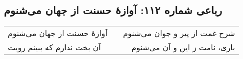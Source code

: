 \begin{center}
\section*{رباعی شماره ۱۱۲: آوازهٔ حسنت از جهان می‌شنوم}
\label{sec:112}
\begin{longtable}{l p{0.5cm} r}
آوازهٔ حسنت از جهان می‌شنوم
&&
شرح غمت از پیر و جوان می‌شنوم
\\
آن بخت ندارم که ببینم رویت
&&
باری، نامت ز این و آن می‌شنوم
\\
\end{longtable}
\end{center}
